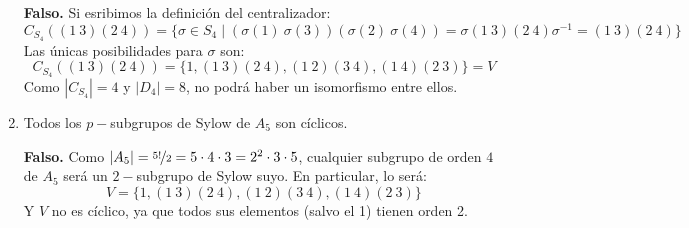 \documentclass[12pt]{article}
\begin{document}
\begin{ejercicio}[5 puntos]
\begin{enumerate}
                \textbf{Falso.} Si esribimos la definición del centralizador:
                \begin{equation*}
                    C_{S_4}((1\ 3)(2\ 4)) = \{\sigma\in S_4 \mid (\sigma(1)\ \sigma(3))(\sigma(2)\ \sigma(4)) = \sigma(1\ 3)(2\ 4)\sigma^{-1} = (1\ 3)(2\ 4)\}
                \end{equation*}
                Las únicas posibilidades para $\sigma$ son:
                \begin{equation*}
                    C_{S_4}((1\ 3)(2\ 4)) = \{1, (1\ 3)(2\ 4), (1\ 2)(3\ 4), (1\ 4)(2\ 3)\} = V
                \end{equation*}
                Como $|C_{S_4}| = 4$ y $|D_4| = 8$, no podrá haber un isomorfismo entre ellos.
            \item Todos los $p-$subgrupos de Sylow de $A_5$ son cíclicos.

                \textbf{Falso.} Como $|A_5| = \nicefrac{5!}{2} = 5\cdot 4\cdot 3 = 2^2 \cdot 3 \cdot 5$, cualquier subgrupo de orden $4$ de $A_5$ será un $2-$subgrupo de Sylow suyo. En particular, lo será:
                \begin{equation*}
                    V = \{1, (1\ 3)(2\ 4), (1\ 2)(3\ 4), (1\ 4)(2\ 3)\}
                \end{equation*}
                Y $V$ no es cíclico, ya que todos sus elementos (salvo el 1) tienen orden 2.
        \end{enumerate}
    \end{ejercicio}
\end{document}
